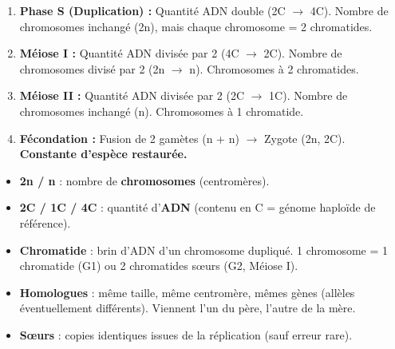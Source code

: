 \documentclass[11pt]{article}
\begin{document}
\begin{methode}
\begin{enumerate}
    \item \textbf{Phase S (Duplication) :} Quantité ADN double (2C $\to$ 4C). Nombre de chromosomes inchangé (2n), mais chaque chromosome = 2 chromatides.
    \item \textbf{Méiose I :} Quantité ADN divisée par 2 (4C $\to$ 2C). Nombre de chromosomes divisé par 2 (2n $\to$ n). Chromosomes à 2 chromatides.
    \item \textbf{Méiose II :} Quantité ADN divisée par 2 (2C $\to$ 1C). Nombre de chromosomes inchangé (n). Chromosomes à 1 chromatide.
    \item \textbf{Fécondation :} Fusion de 2 gamètes (n + n) $\to$ Zygote (2n, 2C). \textbf{Constante d'espèce restaurée.}
\end{enumerate}
\end{methode}

\begin{attention}
\begin{itemize}
    \item \textbf{2n / n} : nombre de \textbf{chromosomes} (centromères).
    \item \textbf{2C / 1C / 4C} : quantité d'\textbf{ADN} (contenu en C = génome haploïde de référence).
    \item \textbf{Chromatide} : brin d'ADN d'un chromosome dupliqué. 1 chromosome = 1 chromatide (G1) ou 2 chromatides sœurs (G2, Méiose I).
    \item \textbf{Homologues} : même taille, même centromère, mêmes gènes (allèles éventuellement différents). Viennent l'un du père, l'autre de la mère.
    \item \textbf{Sœurs} : copies identiques issues de la réplication (sauf erreur rare).
\end{itemize}
\end{attention}
\end{document}
